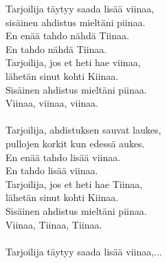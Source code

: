 
            Tarjoilija täytyy saada lisää viinaa, \\
            sisäinen ahdistus mieltäni piinaa.  \\
            En enää tahdo nähdä Tiinaa.  \\
            En tahdo nähdä Tiinaa.  \\
            Tarjoilija, jos et heti hae viinaa,  \\
            lähetän sinut kohti Kiinaa.  \\
            Sisäinen ahdistus mieltäni piinaa.  \\
            Viinaa, viinaa, viinaa. \\
\hspace{10mm} \\
            Tarjoilija, ahdistuksen sauvat laukes,  \\
            pullojen korkit kun edessä aukes. \\
            En enää tahdo lisää viinaa. \\
            En tahdo lisää viinaa.  \\
            Tarjoilija, jos et heti hae Tiinaa,  \\
            lähetän sinut kohti Kiinaa.  \\
            Sisäinen ahdistus mieltäni piinaa.  \\
            Viinaa, Tiinaa, Tiinaa. \\
\hspace{10mm} \\
            Tarjoilija täytyy saada lisää viinaa,... \\
